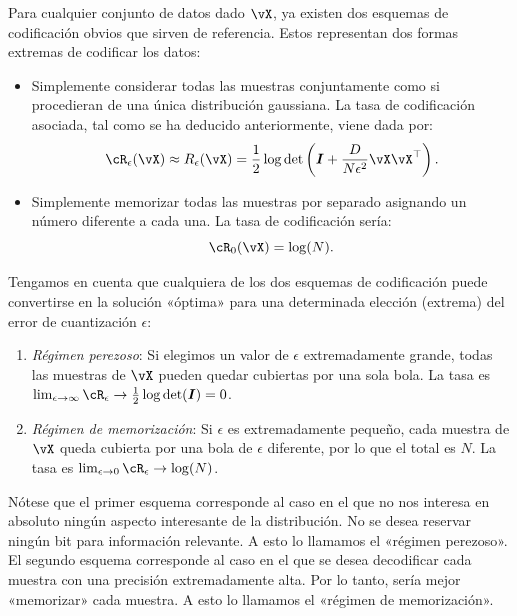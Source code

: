\documentclass[../../book-main.tex]{subfiles}
\begin{document}
Para cualquier conjunto de datos dado $\vX$, ya existen dos esquemas de codificación
obvios que sirven de referencia. Estos representan dos formas extremas de codificar los datos:
\begin{itemize}
    \item Simplemente considerar todas las muestras conjuntamente como si procedieran de una
        única distribución gaussiana. La tasa de codificación asociada, tal como se ha
        deducido anteriormente, viene dada por: 
        \begin{equation}
            \cR_{\epsilon}(\vX) \approx R_{\epsilon}(\vX) =
            \frac{1}{2} \log \det \left(\boldsymbol{I} +
            \frac{D}{N\epsilon^2} \vX\vX^\top \right).
        \end{equation}
    \item Simplemente memorizar todas las muestras por separado asignando un
        número diferente a cada una. La tasa de codificación sería: 
        \begin{equation}
            \cR_0(\vX) = \log(N).
        \end{equation}
\end{itemize}

Tengamos en cuenta que cualquiera de los dos esquemas de codificación puede convertirse en la solución «óptima»
para una determinada elección (extrema) del error de cuantización $\epsilon$:
\begin{enumerate}
    \item {\em Régimen perezoso}: Si elegimos un valor de $\epsilon$ extremadamente
        grande, todas las muestras de $\vX$ pueden quedar cubiertas por una sola bola.
        La tasa es  $\lim_{\epsilon \rightarrow \infty} \cR_\epsilon
        \rightarrow \frac{1}{2}\log\det (\boldsymbol{I}) = 0$.
    \item {\em Régimen de memorización}: Si $\epsilon$ es extremadamente
        pequeño, cada muestra de $\vX$  queda cubierta por una
        bola de $\epsilon$ diferente, por lo que el total es $N$. La tasa es
        $\lim_{\epsilon \rightarrow 0} \cR_\epsilon \rightarrow \log(N)$. 
\end{enumerate}
Nótese que el primer esquema corresponde al caso en el que
no nos interesa en absoluto ningún aspecto interesante de la distribución.
No se desea reservar ningún bit para información relevante. A esto lo llamamos
el «régimen perezoso». El segundo esquema corresponde al
caso en el que se desea decodificar cada muestra con una precisión extremadamente alta.
Por lo tanto, sería mejor «memorizar» cada muestra. A esto lo llamamos
el «régimen de memorización».
\end{document}

